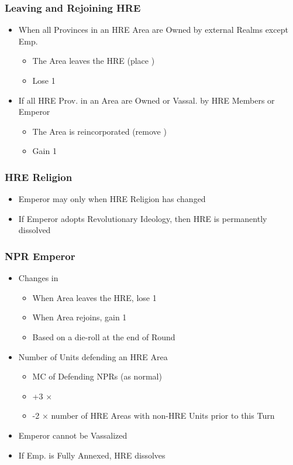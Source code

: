 \documentclass[10pt]{article}
\begin{document}
\subsubsection*{Leaving and Rejoining HRE }
\begin{itemize}
	\item When all Provinces in an HRE Area are Owned by external Realms except Emp.
	\begin{itemize}
		\item The Area leaves the HRE (place \nothre)
		\item Lose 1\authority
	\end{itemize}
	\item If all HRE Prov. in an Area are Owned or Vassal. by HRE Members or Emperor
	\begin{itemize}
		\item The Area is reincorporated (remove \nothre)
		\item Gain 1\authority
	\end{itemize}
\end{itemize}

\subsubsection*{HRE Religion }
\begin{itemize}
	\item Emperor may  only when HRE Religion has changed
	\item If Emperor adopts Revolutionary Ideology, then HRE is permanently dissolved
\end{itemize}

\subsubsection*{NPR Emperor }
\begin{itemize}
	\item Changes in \authority
	\begin{itemize}
		\item When Area leaves the HRE, lose 1\authority
		\item When Area rejoins, gain 1\authority
		\item Based on a die-roll at the end of Round
	\end{itemize}
	\item Number of Units defending an HRE Area
	\begin{itemize}
		\item MC of Defending NPRs (as normal)
		\item +3 × \authority
		\item -2 × number of HRE Areas with non-HRE Units prior to this Turn
	\end{itemize}
	\item Emperor cannot be Vassalized
	\item If Emp. is Fully Annexed, HRE dissolves
\end{itemize}
\end{document}
